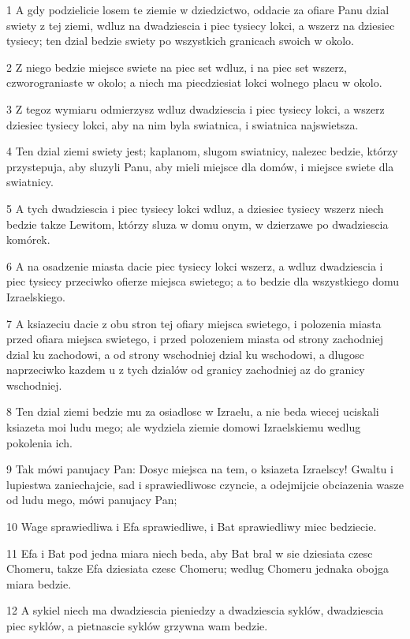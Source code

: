 \par 1 A gdy podzielicie losem te ziemie w dziedzictwo, oddacie za ofiare Panu dzial swiety z tej ziemi, wdluz na dwadziescia i piec tysiecy lokci, a wszerz na dziesiec tysiecy; ten dzial bedzie swiety po wszystkich granicach swoich w okolo.
\par 2 Z niego bedzie miejsce swiete na piec set wdluz, i na piec set wszerz, czworograniaste w okolo; a niech ma piecdziesiat lokci wolnego placu w okolo.
\par 3 Z tegoz wymiaru odmierzysz wdluz dwadziescia i piec tysiecy lokci, a wszerz dziesiec tysiecy lokci, aby na nim byla swiatnica, i swiatnica najswietsza.
\par 4 Ten dzial ziemi swiety jest; kaplanom, slugom swiatnicy, nalezec bedzie, którzy przystepuja, aby sluzyli Panu, aby mieli miejsce dla domów, i miejsce swiete dla swiatnicy.
\par 5 A tych dwadziescia i piec tysiecy lokci wdluz, a dziesiec tysiecy wszerz niech bedzie takze Lewitom, którzy sluza w domu onym, w dzierzawe po dwadziescia komórek.
\par 6 A na osadzenie miasta dacie piec tysiecy lokci wszerz, a wdluz dwadziescia i piec tysiecy przeciwko ofierze miejsca swietego; a to bedzie dla wszystkiego domu Izraelskiego.
\par 7 A ksiazeciu dacie z obu stron tej ofiary miejsca swietego, i polozenia miasta przed ofiara miejsca swietego, i przed polozeniem miasta od strony zachodniej dzial ku zachodowi, a od strony wschodniej dzial ku wschodowi, a dlugosc naprzeciwko kazdem u z tych dzialów od granicy zachodniej az do granicy wschodniej.
\par 8 Ten dzial ziemi bedzie mu za osiadlosc w Izraelu, a nie beda wiecej uciskali ksiazeta moi ludu mego; ale wydziela ziemie domowi Izraelskiemu wedlug pokolenia ich.
\par 9 Tak mówi panujacy Pan: Dosyc miejsca na tem, o ksiazeta Izraelscy! Gwaltu i lupiestwa zaniechajcie, sad i sprawiedliwosc czyncie, a odejmijcie obciazenia wasze od ludu mego, mówi panujacy Pan;
\par 10 Wage sprawiedliwa i Efa sprawiedliwe, i Bat sprawiedliwy miec bedziecie.
\par 11 Efa i Bat pod jedna miara niech beda, aby Bat bral w sie dziesiata czesc Chomeru, takze Efa dziesiata czesc Chomeru; wedlug Chomeru jednaka obojga miara bedzie.
\par 12 A sykiel niech ma dwadziescia pieniedzy a dwadziescia syklów, dwadziescia piec syklów, a pietnascie syklów grzywna wam bedzie.
